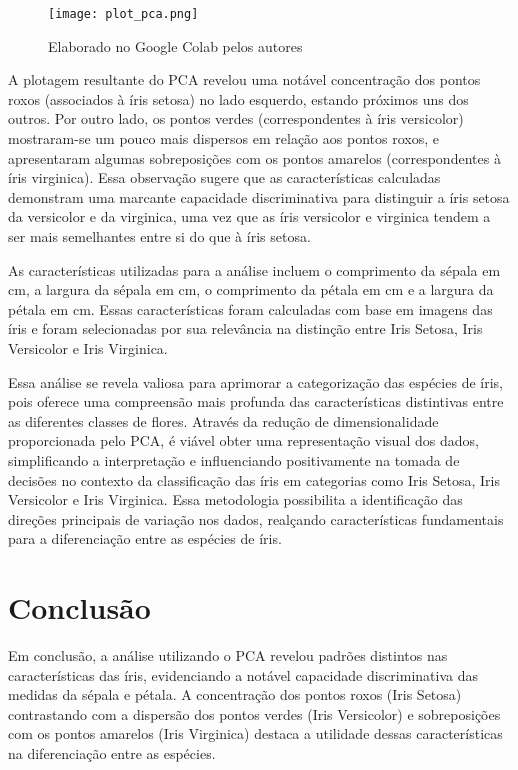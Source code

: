 \documentclass{article}
\begin{document}
\begin{figure}[h]
  \centering
  \texttt{[image: plot\_pca.png]}
  \caption{\label{fig:frog}Elaborado no Google Colab pelos autores}
\end{figure}

A plotagem resultante do PCA revelou uma notável concentração dos pontos roxos (associados à íris setosa) no lado esquerdo, estando próximos uns dos outros. Por outro lado, os pontos verdes (correspondentes à íris versicolor) mostraram-se um pouco mais dispersos em relação aos pontos roxos, e apresentaram algumas sobreposições com os pontos amarelos (correspondentes à íris virginica). Essa observação sugere que as características calculadas demonstram uma marcante capacidade discriminativa para distinguir a íris setosa da versicolor e da virginica, uma vez que as íris versicolor e virginica tendem a ser mais semelhantes entre si do que à íris setosa.

As características utilizadas para a análise incluem o comprimento da sépala em cm, a largura da sépala em cm, o comprimento da pétala em cm e a largura da pétala em cm. Essas características foram calculadas com base em imagens das íris e foram selecionadas por sua relevância na distinção entre Iris Setosa, Iris Versicolor e Iris Virginica.

Essa análise se revela valiosa para aprimorar a categorização das espécies de íris, pois oferece uma compreensão mais profunda das características distintivas entre as diferentes classes de flores. Através da redução de dimensionalidade proporcionada pelo PCA, é viável obter uma representação visual dos dados, simplificando a interpretação e influenciando positivamente na tomada de decisões no contexto da classificação das íris em categorias como Iris Setosa, Iris Versicolor e Iris Virginica. Essa metodologia possibilita a identificação das direções principais de variação nos dados, realçando características fundamentais para a diferenciação entre as espécies de íris.

\vspace{1cm}

\section*{Conclusão}

Em conclusão, a análise utilizando o PCA revelou padrões distintos nas características das íris, evidenciando a notável capacidade discriminativa das medidas da sépala e pétala. A concentração dos pontos roxos (Iris Setosa) contrastando com a dispersão dos pontos verdes (Iris Versicolor) e sobreposições com os pontos amarelos (Iris Virginica) destaca a utilidade dessas características na diferenciação entre as espécies. 
\end{document}
